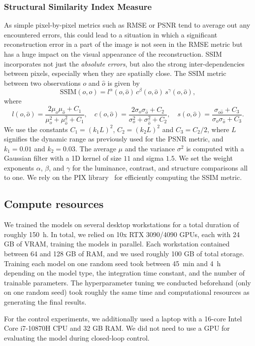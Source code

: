 \subsubsection{Structural Similarity Index Measure}
As simple pixel-by-pixel metrics such as \gls{RMSE} or \gls{PSNR} tend to average out any encountered errors, this could lead to a situation in which a significant reconstruction error in a part of the image is not seen in the \gls{RMSE} metric but has a huge impact on the visual appearance of the reconstruction. \gls{SSIM}~\citep{wang2004image} incorporates not just the \emph{absolute errors}, but also the strong inter-dependencies between pixels, especially when they are spatially close.
The \gls{SSIM} metric between two observations $o$ and $\hat{o}$ is given by
\begin{equation}
    \mathrm{SSIM}(o, \hat{o}) = l^\alpha(o, \hat{o}) \, c^\beta(o, \hat{o}) \, s^\gamma(o, \hat{o}),
\end{equation}
where
\begin{equation}
    l(o, \hat{o}) = \frac{2 \mu_o \mu_{\hat{o}} + C_1}{\mu_o^2 + \mu_{\hat{o}}^2 + C_1},
    \quad
    c(o, \hat{o}) = \frac{2 \sigma_o \sigma_{\hat{o}} + C_2}{\sigma_o^2 + \sigma_{\hat{o}}^2 + C_2},
    \quad 
    s(o, \hat{o}) = \frac{\sigma_{o\hat{o}} + C_3}{\sigma_o \sigma_{\hat{o}} + C_3}.
\end{equation}
We use the constants $C_1 = (k_1 L)^2$, $C_2 = (k_2 L)^2$ and $C_3 = C_2 / 2$, where $L$ signifies the dynamic range as previously used for the \gls{PSNR} metric,
and $k_1 = 0.01$ and $k_2 = 0.03$. The average $\mu$ and the variance $\sigma^2$ is computed with a Gaussian filter with a 1D kernel of size $11$ and sigma $1.5$.
We set the weight exponents $\alpha$, $\beta$, and $\gamma$ for the luminance, contrast, and structure comparisons all to one.
We rely on the PIX library~\citep{deepmind2020jax} for efficiently computing the \gls{SSIM} metric.

\subsection{Compute resources}\label{apx:sub:compute_resource}

We trained the models on several desktop workstations for a total duration of roughly \SI{150}{h}.
In total, we relied on 10x RTX 3090/4090 GPUs, each with 24 GB of VRAM, training the models in parallel.
Each workstation contained between 64 and 128 GB of RAM, and we used roughly 100 GB of total storage. 
Training each model on one random seed took between \SI{45}{min} and \SI{4}{h} depending on the model type, the integration time constant, and the number of trainable parameters.
The hyperparameter tuning we conducted beforehand (only on one random seed) took roughly the same time and computational resources as generating the final results.

For the control experiments, we additionally used a laptop with a 16-core Intel Core i7-10870H CPU and 32 GB RAM. We did not need to use a GPU for evaluating the model during closed-loop control.
